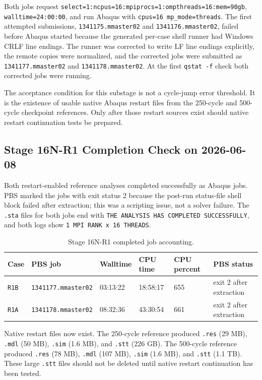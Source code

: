 \documentclass[11pt,a4paper]{article}
\newcommand{\code}[1]{\texttt{#1}}
\begin{document}
Both jobs request \code{select=1:ncpus=16:mpiprocs=1:ompthreads=16:mem=90gb}, \code{walltime=24:00:00}, and run Abaqus with \code{cpus=16 mp\_mode=threads}. The first attempted submissions, \code{1341175.mmaster02} and \code{1341176.mmaster02}, failed before Abaqus started because the generated per-case shell runner had Windows CRLF line endings. The runner was corrected to write LF line endings explicitly, the remote copies were normalized, and the corrected jobs were submitted as \code{1341177.mmaster02} and \code{1341178.mmaster02}. At the first \code{qstat -f} check both corrected jobs were running.

The acceptance condition for this substage is not a cycle-jump error threshold. It is the existence of usable native Abaqus restart files from the 250-cycle and 500-cycle checkpoint references. Only after those restart sources exist should native restart continuation tests be prepared.

\subsection{Stage 16N-R1 Completion Check on 2026-06-08}

Both restart-enabled reference analyses completed successfully as Abaqus jobs. PBS marked the jobs with exit status 2 because the post-run status-file shell block failed after extraction; this was a scripting issue, not a solver failure. The \code{.sta} files for both jobs end with \code{THE ANALYSIS HAS COMPLETED SUCCESSFULLY}, and both logs show \code{1 MPI RANK x 16 THREADS}.

\begin{table}[H]
\centering
\caption{Stage 16N-R1 completed job accounting.}
\begin{tabular}{llllll}
\toprule
Case & PBS job & Walltime & CPU time & CPU percent & PBS status \\
\midrule
\code{R1B} & \code{1341177.mmaster02} & 03:13:22 & 18:58:17 & 655 & exit 2 after extraction \\
\code{R1A} & \code{1341178.mmaster02} & 08:32:36 & 43:30:54 & 661 & exit 2 after extraction \\
\bottomrule
\end{tabular}
\end{table}

Native restart files now exist. The 250-cycle reference produced \code{.res} (29 MB), \code{.mdl} (50 MB), \code{.sim} (1.6 MB), and \code{.stt} (226 GB). The 500-cycle reference produced \code{.res} (78 MB), \code{.mdl} (107 MB), \code{.sim} (1.6 MB), and \code{.stt} (1.1 TB). These large \code{.stt} files should not be deleted until native restart continuation has been tested.
\end{document}
